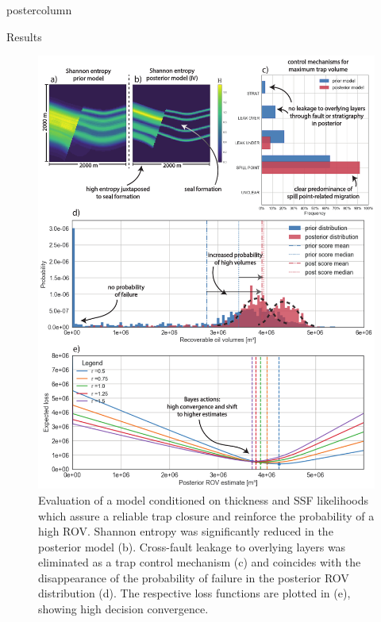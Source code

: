 \documentclass{beamer}
\begin{document}
\begin{frame}
\begin{columns}
\begin{column}{.618\textwidth}
\begin{beamercolorbox}[center]{postercolumn}
\begin{minipage}{.98\textwidth}
{\begin{myblock}{Results}
	\vspace{0.5em}
	\begin{figure}
		\begin{minipage}{0.98\textwidth}
			\begin{minipage}[t]{0.5\textwidth}
				\centering\includegraphics[width=1\textwidth]{figures/ML4}
				\caption{Evaluation of a model conditioned on thickness and SSF likelihoods which assure a reliable trap closure and reinforce the probability of a high ROV. Shannon entropy was significantly reduced in the posterior model (b). Cross-fault leakage to overlying layers was eliminated as a trap control mechanism (c) and coincides with the disappearance of the probability of failure in the posterior ROV distribution (d). The respective loss functions are plotted in (e), showing high decision convergence.}
				\label{fig:ML4}
			\end{minipage}
			\hspace{\fill}
			\begin{minipage}[t]{0.5\textwidth}

\end{minipage}
\end{minipage}
\end{figure}
\end{myblock}}
\end{minipage}
\end{beamercolorbox}
\end{column}
\end{columns}
\end{frame}
\end{document}
